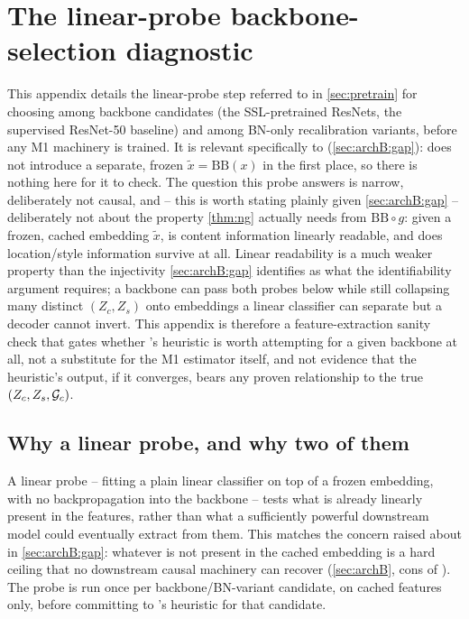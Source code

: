 \section{The linear-probe backbone-selection diagnostic}
\label{app:probe}

This appendix details the linear-probe step referred to in \cref{sec:pretrain} for choosing among
backbone candidates (the SSL-pretrained ResNets, the supervised ResNet-50 baseline) and among BN-only
recalibration variants, before any M1 machinery is trained. It is relevant specifically to
 (\cref{sec:archB:gap}):  does not introduce a separate, frozen
$\tilde x=\mathrm{BB}(x)$ in the first place, so there is nothing here for it to check. The question
this probe answers is narrow, deliberately not causal, and -- this is worth stating plainly given
\cref{sec:archB:gap} -- deliberately not about the property \cref{thm:ng} actually needs from
$\mathrm{BB}\circ g$: given a frozen, cached embedding $\tilde x$, is content information linearly
readable, and does location/style information survive at all. Linear readability is a much weaker
property than the injectivity \cref{sec:archB:gap} identifies as what the identifiability argument
requires; a backbone can pass both probes below while still collapsing many distinct $(Z_c,Z_s)$ onto
embeddings a linear classifier can separate but a decoder cannot invert. This appendix is therefore a
feature-extraction sanity check that gates whether 's heuristic is worth attempting
for a given backbone at all, not a substitute for the M1 estimator itself, and not evidence that the
heuristic's output, if it converges, bears any proven relationship to the true $(Z_c,Z_s,\mathcal{G}_c)$.

\subsection{Why a linear probe, and why two of them}
A linear probe -- fitting a plain linear classifier on top of a frozen embedding, with no
backpropagation into the backbone -- tests what is already linearly present in the features, rather
than what a sufficiently powerful downstream model could eventually extract from them. This matches
the concern raised about  in \cref{sec:archB:gap}: whatever is not present in 
the cached embedding is a hard ceiling that no downstream causal machinery can recover
(\cref{sec:archB}, cons of ). The probe is run once per backbone/BN-variant 
candidate, on cached features only, before committing to 's heuristic for that
candidate.

